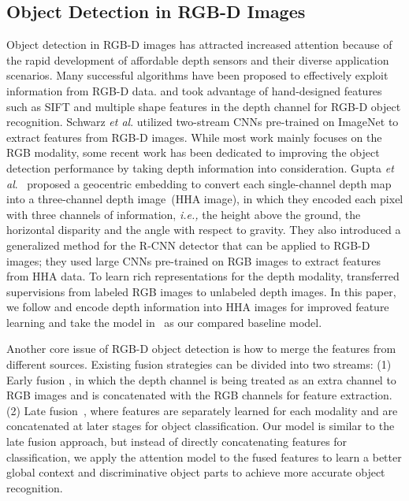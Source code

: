 \documentclass[journal]{IEEEtran}
\begin{document}
\subsection{Object Detection in RGB-D Images}
Object detection in RGB-D images has attracted increased attention because of the rapid development of affordable depth sensors and their diverse application scenarios. Many successful algorithms have been proposed to effectively exploit information from RGB-D data. \cite{bo2011depth} and \cite{lai2011large} took advantage of hand-designed features such as SIFT and multiple shape features in the depth channel for RGB-D object recognition. Schwarz \textit{et al}. \cite{schwarz2015rgb} utilized two-stream CNNs pre-trained on ImageNet to extract features from RGB-D images. While most work mainly focuses on the RGB modality, some recent work has been dedicated to improving the object detection performance by taking depth information into consideration. Gupta \textit{et al}.~\cite{gupta2014learning} proposed a geocentric embedding to convert each single-channel depth map into a three-channel depth image~(HHA image), in which they encoded each pixel with three channels of information, \textit{i.e.,} the height above the ground, the horizontal disparity and the angle with respect to gravity. They also introduced a generalized method for the R-CNN detector that can be applied to RGB-D images; they used large CNNs pre-trained on RGB images to extract features from HHA data. To learn rich representations for the depth modality, \cite{gupta2016cross} transferred supervisions from labeled RGB images to unlabeled depth images. In this paper, we follow \cite{gupta2014learning} and encode depth information into HHA images for improved feature learning and take the model in~\cite{gupta2016cross} as our compared baseline model.

Another core issue of RGB-D object detection is how to merge the features from different sources. Existing fusion strategies can be divided into two streams: (1) Early fusion \cite{blum2012learned, bo2011object, bo2011depth}, in which the depth channel is being treated as an extra channel to RGB images and is concatenated with the RGB channels for feature extraction. (2) Late fusion~\cite{eitel2015multimodal, gupta2014learning, spinello2012leveraging, gupta2016cross}, where features are separately learned for each modality and are concatenated at later stages for object classification. Our model is similar to the late fusion approach, but instead of directly concatenating features for classification, we apply the attention model to the fused features to learn a better global context and discriminative object parts to achieve more accurate object recognition.
\end{document}
